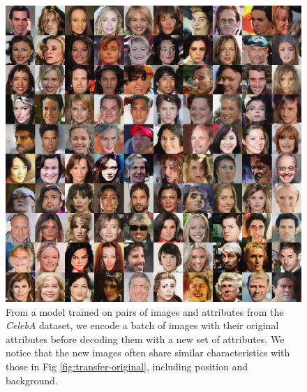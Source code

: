\documentclass{article}
\begin{document}
\begin{figure}[H]
\vspace{80pt}
    \centering \includegraphics[width=1.\textwidth]{celebattr_transfer.png}
    \caption{From a model trained on pairs of images and attributes from the \emph{CelebA} dataset, we encode a batch of images with their original attributes before decoding them with a new set of attributes. We notice that the new images often share similar characteristics with those in Fig \ref{fig:transfer-original}, including position and background.}
\end{figure}
\fi
\end{document}
